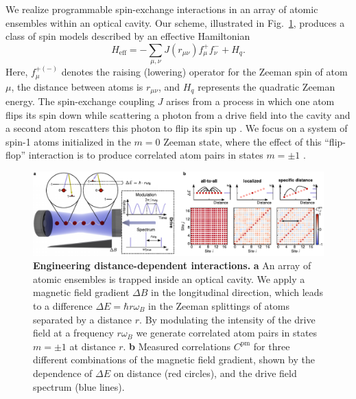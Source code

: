 \documentclass[aps,pra,superscriptaddress,12pt]{revtex4-1} %
\begin{document}
\begin{bibunit}
We realize programmable spin-exchange interactions in an array of atomic ensembles within an optical cavity.  Our scheme, illustrated in Fig.~\ref{fig:overview}, produces a class of spin models described by an effective Hamiltonian
\begin{equation}
H_{\text{eff}} = -\sum_{\mu,\nu} J(r_{\mu\nu}) f^+_\mu f^-_\nu + H_q. %
\label{eq:Heff}
\end{equation} Here, $f^{+(-)}_\mu$ denotes the raising (lowering) operator for the Zeeman spin of atom $\mu$, the distance between atoms is $r_{\mu\nu}$, and $H_q$ represents the quadratic Zeeman energy.  The spin-exchange coupling $J$ arises from a process in which one atom flips its spin down while scattering a photon from a drive field into the cavity and a second atom rescatters this photon to flip its spin up \cite{davis2019photon,davis2020protecting}. We focus on a system of spin-1 atoms initialized in the $m=0$ Zeeman state, where the effect of this ``flip-flop'' interaction is to produce correlated atom pairs in states $m=\pm 1$ \cite{masson2017cavity,davis2019photon,hamley2012spin}.

\begin{figure}[t]
\includegraphics[width=\textwidth]{Figures/Figure1.pdf}
\caption{\textbf{Engineering distance-dependent interactions.} 
\textbf{a} An array of atomic ensembles is trapped inside an optical cavity. We apply a magnetic field gradient $\Delta B$ in the longitudinal direction, which leads to a difference $\Delta E = \hbar r\omega_B$ in the Zeeman splittings of atoms separated by a distance $r$. By modulating the intensity of the drive field at a frequency $r\omega_{B}$ we generate correlated atom pairs in states $m = \pm1$ at distance $r$.
\textbf{b} Measured correlations $C^\text{pm}$ for three different combinations of the magnetic field gradient, shown by the dependence of $\Delta E$ on distance (red circles), and the drive field spectrum (blue lines).
}
\label{fig:overview}
\end{figure}



\end{bibunit}
\end{document}
